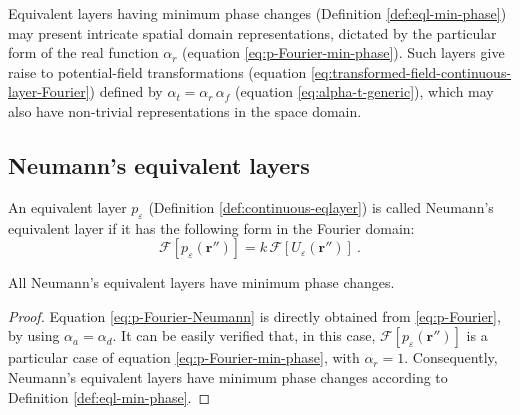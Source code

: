 Equivalent layers having minimum phase changes (Definition \ref{def:eql-min-phase}) may present intricate 
spatial domain representations, dictated by the particular form of the real function $\alpha_{r}$
(equation \ref{eq:p-Fourier-min-phase}).
Such layers give raise to potential-field transformations (equation \ref{eq:transformed-field-continuous-layer-Fourier})
defined by $\alpha_{t} = \alpha_{r} \, \alpha_{f}$ (equation \ref{eq:alpha-t-generic}), which may also
have non-trivial representations in the space domain.

\subsection{Neumann's equivalent layers}

\begin{definition}
	An equivalent layer $p_{\varepsilon}$ (Definition \ref{def:continuous-eqlayer}) is called Neumann's equivalent 
	layer if it has the following form in the Fourier domain:
	\begin{equation}
		\mathcal{F} [ p_{\varepsilon}(\mathbf{r}'') ] =
		k \, \mathcal{F} [ U_{\varepsilon}(\mathbf{r}'') ] \: .
		\label{eq:p-Fourier-Neumann}
	\end{equation}
	\label{def:eql-Neumann}
\end{definition}
\begin{proposition}
	All Neumann's equivalent layers have minimum phase changes.
	\label{prop:eql-Neumann}
\end{proposition}
\begin{proof}
	Equation \ref{eq:p-Fourier-Neumann} is directly obtained from \ref{eq:p-Fourier}, by using 
	$\alpha_{a} = \alpha_{d}$. It can be easily verified that, in this case, 
	$\mathcal{F} [ p_{\varepsilon}(\mathbf{r}'') ]$ is a particular case of equation \ref{eq:p-Fourier-min-phase},
	with $\alpha_{r} = 1$. Consequently, Neumann's equivalent layers have minimum phase changes
	according to Definition \ref{def:eql-min-phase}.
\end{proof}


